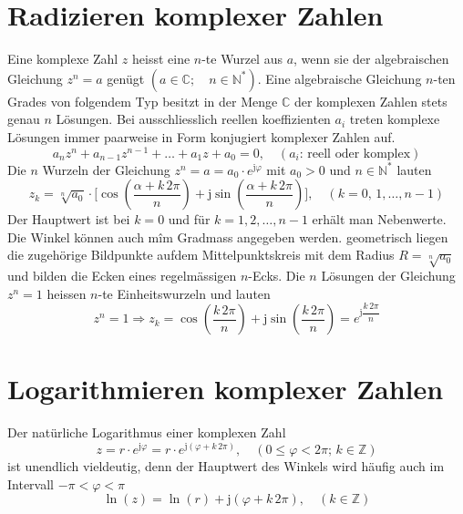 \section{Radizieren komplexer Zahlen}
Eine komplexe Zahl $z$ heisst eine $n$-te Wurzel aus $a$, wenn sie der algebraischen Gleichung $z^n=a$ genügt $\left(a\in\mathbb{C};\quad n\in \mathbb{N}^*\right)$.
\newline\newline
Eine algebraische Gleichung $n$-ten Grades von folgendem Typ besitzt in der Menge $\mathbb{C}$ der komplexen Zahlen stets genau $n$ Lösungen. Bei ausschliesslich reellen koeffizienten $a_i$ treten komplexe Lösungen immer paarweise in Form konjugiert komplexer Zahlen auf.
\begin{equation}
\boxed{a_nz^n+a_{n-1}z^{n-1}+\dotso + a_1z+a_0=0,\quad \left(a_i:\,\text{reell oder komplex}\right)}
\end{equation}
Die $n$ Wurzeln der Gleichung $z^n=a=a_0\cdot e^{\text{j}\varphi}$ mit $a_0>0$ und $n\in \mathbb{N}^*$ lauten
\begin{equation}
\boxed{z_k=\sqrt[n]{a_0}\cdot \Big[\cos\left(\dfrac{\alpha+k\,2\pi}{n}\right)+\text{j}\sin\left(\dfrac{\alpha+k\,2\pi}{n}\right)\Big],\quad \left(k=0,\,1,\dotso, n-1\right)}
\end{equation}
Der Hauptwert ist bei $k=0$ und für $k=1, 2, \dotso, n-1$ erhält man Nebenwerte. Die Winkel können auch mîm Gradmass angegeben werden.
\newline\newline
geometrisch liegen die zugehörige Bildpunkte aufdem Mittelpunktskreis mit dem Radius $R=\sqrt[n]{a_0}$ und bilden die Ecken eines regelmässigen $n$-Ecks.
\newline\newline
Die $n$ Lösungen der Gleichung $z^n=1$ heissen $n$-te Einheitswurzeln und lauten
\begin{equation}
\boxed{z^n=1\Longrightarrow z_k=\cos\left(\dfrac{k\,2\pi}{n}\right)+\text{j}\sin\left(\dfrac{k\,2\pi}{n}\right)=e^{\text{j}\dfrac{k\,2\pi}{n}}}
\end{equation}
\section{Logarithmieren komplexer Zahlen}
Der natürliche Logarithmus einer komplexen Zahl 
\begin{equation}
\boxed{z=r\cdot e^{\text{j}\varphi}=r\cdot e^{\text{j}\left(\varphi+k\,2\pi\right)},\quad \left(0\leq \varphi< 2\pi;\,k\in \mathbb{Z}\right)}
\end{equation}
ist unendlich vieldeutig, denn der Hauptwert des Winkels wird häufig auch im Intervall $-\pi<\varphi < \pi$
\begin{equation}
\boxed{\ln\left(z\right)=\ln\left(r\right)+\text{j}\left(\varphi+k\,2\pi\right),\quad \left(k\in \mathbb{Z}\right)}
\end{equation}
